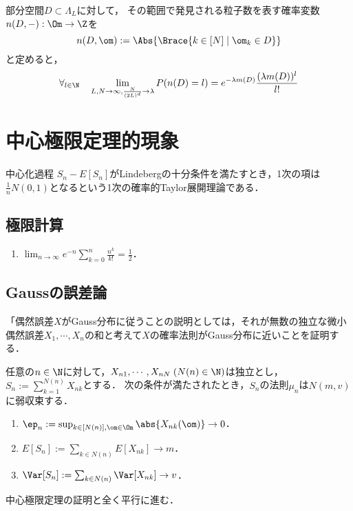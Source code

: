 \documentclass[uplatex,dvipdfmx]{jsreport}
\begin{document}
\begin{theorem}
    部分空間$D\subset\Lambda_L$に対して，
    その範囲で発見される粒子数を表す確率変数$n(D,-):\Om\to\Z$を
    \[n(D,\om):=\Abs{\Brace{k\in[N]\mid\om_k\in D}}\]
    と定めると，
    \[\forall_{l\in\N}\quad\lim_{L,N\to\infty,\frac{N}{(2L)^d}\to\lambda}P(n(D)=l)=e^{-\lambda m(D)}\frac{(\lambda m(D))^l}{l!}\]
\end{theorem}

\section{中心極限定理的現象}

\begin{tcolorbox}[colframe=ForestGreen, colback=ForestGreen!10!white,breakable,colbacktitle=ForestGreen!40!white,coltitle=black,fonttitle=\bfseries\sffamily,
title=]
    中心化過程
    $S_n-E[S_n]$がLindebergの十分条件を満たすとき，1次の項は$\frac{1}{n}N(0,1)$となるという1次の確率的Taylor展開理論である．
\end{tcolorbox}

\subsection{極限計算}

\begin{proposition}\mbox{}
    \begin{enumerate}
        \item $\lim_{n\to\infty}e^{-n}\sum^n_{k=0}\frac{n^k}{k!}=\frac{1}{2}$．
    \end{enumerate}
\end{proposition}

\subsection{Gaussの誤差論}

\begin{tcolorbox}[colframe=ForestGreen, colback=ForestGreen!10!white,breakable,colbacktitle=ForestGreen!40!white,coltitle=black,fonttitle=\bfseries\sffamily,
title=]
    「偶然誤差$X$がGauss分布に従うことの説明としては，それが無数の独立な微小偶然誤差$X_1,\cdots,X_n$の和と考えて$X$の確率法則がGauss分布に近いことを証明する．
\end{tcolorbox}

\begin{theorem}
    任意の$n\in\N$に対して，$X_{n1},\cdots,X_{nN}\;(N(n)\in\N)$は独立とし，$S_n:=\sum_{k=1}^{N(n)}X_{nk}$とする．
    次の条件が満たされたとき，$S_n$の法則$\mu_n$は$N(m,v)$に弱収束する．
    \begin{enumerate}
        \item $\ep_n:=\sup_{k\in[N(n)],\om\in\Om}\abs{X_{nk}(\om)}\to0$．
        \item $E[S_n]:=\sum_{k\in N(n)}E[X_{nk}]\to m$．
        \item $\Var[S_n]:=\sum_{k\in N(n)}\Var[X_{nk}]\to v$．
    \end{enumerate}
\end{theorem}
\begin{Proof}
    中心極限定理の証明と全く平行に進む．
\end{Proof}
\end{document}
